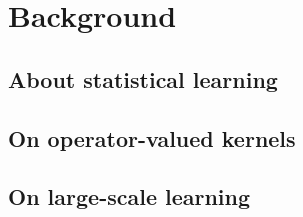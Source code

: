 \chapter{Background} %
\label{ch:background} %

\section{About statistical learning}
\label{sec:about_statistical_learning}

\section{On operator-valued kernels}
\label{sec:background_on_operator-valued_kernels}

\section{On large-scale learning}
\label{sec:on_large-scale_learning}
